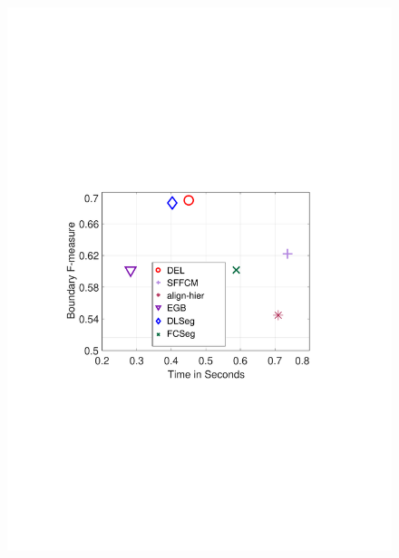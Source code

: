 \begin{figure}[h]
{\begin{minipage}[b]{0.3\linewidth}
\includegraphics[width=1\linewidth]{figures/img/Chart/fig1_2.pdf}
\end{minipage}}
\hspace{-2.5mm}
\end{figure}
